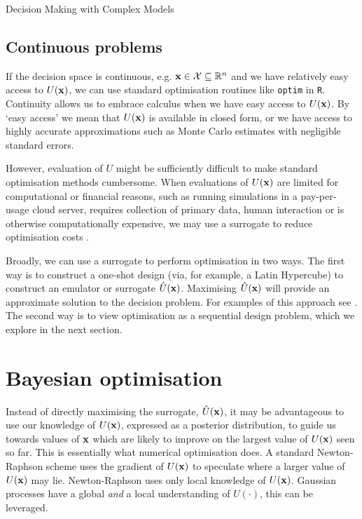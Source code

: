 \begin{chapter}{Decision Making with Complex Models \label{Chap:optimisation}}
\subsection{Continuous problems}
If the decision space is continuous, e.g. $\mathbf{x} \in \mathcal{X} \subseteq \mathbb{R}^n$ and we have relatively easy access to $U(\mathbf{x})$, we can use standard optimisation routines like \verb|optim| in \verb|R|. Continuity allows us to embrace calculus when we have easy access to $U(\mathbf{x})$. By `easy access' we mean that $U(\mathbf{x})$ is available in closed form, or we have access to highly accurate approximations such as Monte Carlo estimates with negligible standard errors.

However, evaluation of $U$ might be sufficiently difficult to make standard optimisation methods cumbersome. When evaluations of $U(\mathbf{x})$ are limited for computational or financial reasons, such as running simulations in a pay-per-usage cloud server, requires collection of primary data, human interaction or is otherwise computationally expensive, we may use a surrogate to reduce optimisation costs \citep{Tresidder2012, Astudillo2020}.

Broadly, we can use a surrogate to perform optimisation in two ways. The first way is to construct a one-shot design (via, for example, a Latin Hypercube) to construct an emulator or surrogate $\hat{U}(\mathbf{x})$. Maximising $\hat{U}(\mathbf{x})$ will provide an approximate solution to the decision problem. For examples of this approach see \citep{Wilson2018, Overstall2017}. The second way is to view optimisation as a sequential design problem, which we explore in the next section.

\section{Bayesian optimisation}
Instead of directly maximising the surrogate, $\hat{U}(\mathbf{x})$, it may be advantageous to use our knowledge of $U(\mathbf{x})$, expressed as a posterior distribution, to guide us towards values of $\mathbf{x}$ which are likely to improve on the largest value of $U(\mathbf{x})$ seen so far. This is essentially what numerical optimisation does. A standard Newton-Raphson scheme uses the gradient of $U(\mathbf{x})$ to speculate where a larger value of $U(\mathbf{x})$ may lie. Newton-Raphson uses only local knowledge of $U(\mathbf{x})$. Gaussian processes have a global \emph{and} a local understanding of $U(\cdot)$, this can be leveraged.


\end{chapter}
